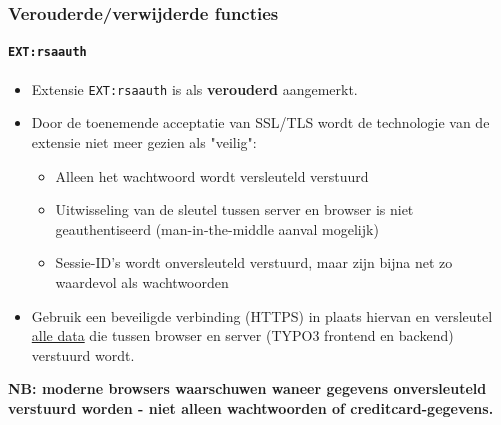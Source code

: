 \begin{frame}[fragile]
	\frametitle{Verouderde/verwijderde functies}
	\framesubtitle{\texttt{EXT:rsaauth}}

	\begin{itemize}
		\item Extensie \texttt{EXT:rsaauth} is als \textbf{verouderd} aangemerkt.
		\item Door de toenemende acceptatie van SSL/TLS wordt de technologie van de extensie niet meer
			gezien als "veilig":

			\begin{itemize}
				\item Alleen het wachtwoord wordt versleuteld verstuurd
				\item Uitwisseling van de sleutel tussen server en browser is niet geauthentiseerd
					(man-in-the-middle aanval mogelijk)
				\item Sessie-ID's wordt onversleuteld verstuurd, maar zijn bijna net zo waardevol als
					wachtwoorden
			\end{itemize}

		\item Gebruik een beveiligde verbinding (HTTPS) in plaats hiervan en versleutel \underline{alle data}
			die tussen browser en server (TYPO3 frontend en backend) verstuurd wordt.

	\end{itemize}

	\smaller
		\textbf{NB: moderne browsers waarschuwen waneer gegevens onversleuteld verstuurd
			worden - niet alleen wachtwoorden of creditcard-gegevens.}
	\normalsize

\end{frame}

